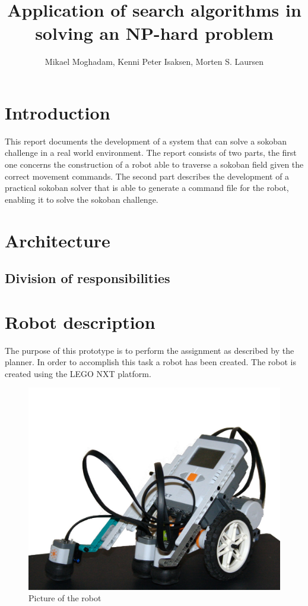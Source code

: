 \documentclass[final, english, a4paper]{article}
\title{Application of search algorithms in solving an NP-hard problem}
\author{Mikael Moghadam, Kenni Peter Isaksen, Morten S. Laursen}
\begin{document}
\maketitle %


%
%
\newpage
\section{Introduction}
This report documents the development of a system that can solve a sokoban challenge in a real world environment. The report consists of two parts, the first one concerns the construction of a robot able to traverse a sokoban field given the correct movement commands. The second part describes the development of a practical sokoban solver that is able to generate a command file for the robot, enabling it to solve the sokoban challenge.
\newpage
\tableofcontents
\newpage
\section{Architecture}
	\subsection{Division of responsibilities}
	
\section{Robot description}
        The purpose of this prototype is to perform the assignment as described by
        the planner. In order to accomplish this task a robot 
        has been created. The robot is created using the LEGO NXT platform. 
        \begin{figure}[htp]
            \centering
    	    \includegraphics[scale=0.3]{robot2}
	        \caption{Picture of the robot}\label{fig:robotPic}
        \end{figure} 
\end{document}
